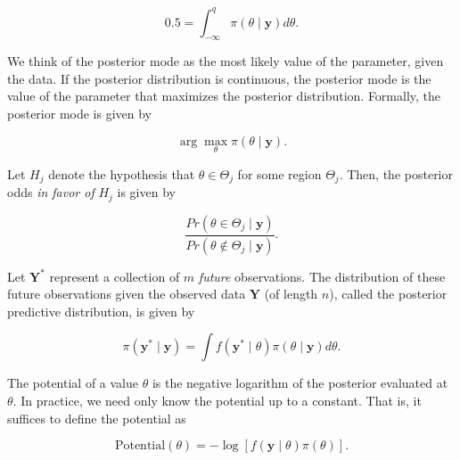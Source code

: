 \documentclass[
  letterpaper,
  DIV=11,
  numbers=noendperiod]{scrreprt}
\providecommand{\tightlist}{%
  \setlength{\itemsep}{0pt}\setlength{\parskip}{0pt}}\usepackage{longtable,booktabs,array}
\theoremstyle{definition}
\theoremstyle{plain}
\theoremstyle{definition}
\theoremstyle{remark}
\begin{document}
\[0.5 = \int_{-\infty}^{q} \pi(\theta \mid \mathbf{y}) d\theta.\]

\begin{description}
\tightlist
\item[Posterior Mode (Definition~\ref{def-posterior-mode})]
We think of the posterior mode as the most likely value of the
parameter, given the data. If the posterior distribution is continuous,
the posterior mode is the value of the parameter that maximizes the
posterior distribution. Formally, the posterior mode is given by
\end{description}

\[\arg \max_{\theta} \pi(\theta \mid \mathbf{y}).\]

\begin{description}
\tightlist
\item[Posterior Odds (Definition~\ref{def-posterior-odds})]
Let \(H_j\) denote the hypothesis that \(\theta \in \Theta_j\) for some
region \(\Theta_j\). Then, the posterior odds \emph{in favor of} \(H_j\)
is given by
\end{description}

\[\frac{Pr\left(\theta \in \Theta_j \mid \mathbf{y}\right)}{Pr\left(\theta \notin \Theta_j \mid \mathbf{y}\right)}.\]

\begin{description}
\tightlist
\item[Posterior Predictive Distribution
(Definition~\ref{def-posterior-predictive-distribution})]
Let \(\mathbf{Y}^*\) represent a collection of \(m\) \emph{future}
observations. The distribution of these future observations given the
observed data \(\mathbf{Y}\) (of length \(n\)), called the posterior
predictive distribution, is given by
\end{description}

\[\pi\left(\mathbf{y}^* \mid \mathbf{y}\right) = \int f\left(\mathbf{y}^* \mid \theta\right) \pi(\theta \mid \mathbf{y}) d\theta.\]

\begin{description}
\tightlist
\item[Potential (Definition~\ref{def-potential})]
The potential of a value \(\theta\) is the negative logarithm of the
posterior evaluated at \(\theta\). In practice, we need only know the
potential up to a constant. That is, it suffices to define the potential
as
\end{description}

\[\text{Potential}(\theta) = -\log\left[f(\mathbf{y} \mid \theta) \pi(\theta)\right].\]
\end{document}
